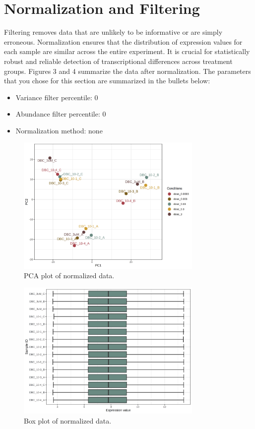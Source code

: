 \documentclass[a4paper]{article}
\begin{document}
\section{Normalization and Filtering}
 Filtering removes data that are unlikely to be informative or are simply erroneous.  Normalization ensures that the distribution of expression values for each sample are similar across the entire experiment.  It is crucial for statistically robust and reliable detection of transcriptional differences across treatment groups.  Figures 3 and 4 summarize the data after normalization. The parameters that you chose for this section are  summarized in the bullets below:  \begin{itemize} \item{Variance filter percentile:  0 } \item{Abundance filter percentile:  0 } \item{Normalization method:  none } \end{itemize} 

\begin{figure}[htp]
\begin{center}
\includegraphics[width=0.8\textwidth]{qc_norm_pca_0dpi72.png}
\caption{
PCA plot of normalized data.
}
\end{center}
\label{qc_norm_pca_0dpi72.png}
\end{figure}
\begin{figure}[htp]
\begin{center}
\includegraphics[width=0.8\textwidth]{qc_norm_boxplot_0dpi72.png}
\caption{
Box plot of normalized data.
}
\end{center}
\label{qc_norm_boxplot_0dpi72.png}
\end{figure}
\end{document}
